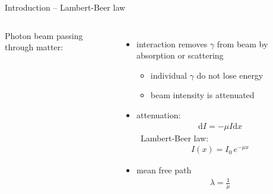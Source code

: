 \documentclass[11pt,xcolor=dvipsnames,professionalfonts]{beamer}
\begin{document}
\begin{frame}{Introduction -- Lambert-Beer law}
	\begin{columns}
		Photon beam passing through matter:
			\begin{itemize}
				\setlength\itemsep{1.em}
				\item interaction removes $\gamma$ from beam by absorption or scattering
				\begin{itemize}
					\item individual $\gamma$ do not lose energy
					\item beam intensity is attenuated
				\end{itemize}
				
				\item attenuation:
				\begin{align*}
					\mathrm{d} I = - \mu I \mathrm{d}x
				\end{align*}
				\textrightarrow~Lambert-Beer law:
				\begin{align*}
				I(x) = I_0 \, e^{-\mu x}
				\end{align*}
				
				\item mean free path
				\begin{align*}
					\lambda = \frac{1}{\mu}
				\end{align*}
			\end{itemize}


\end{columns}
\end{frame}
\end{document}
